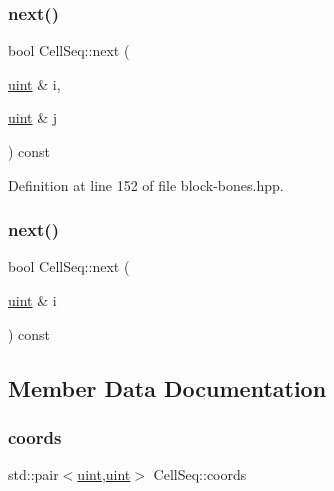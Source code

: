 \subsubsection{\texorpdfstring{next()}{next()}\hspace{0.1cm}{\footnotesize\ttfamily [1/2]}}
{\footnotesize\ttfamily bool Cell\+Seq\+::next (\begin{DoxyParamCaption}\item[{\hyperlink{typedefs_8hpp_a91ad9478d81a7aaf2593e8d9c3d06a14}{uint} \&}]{i,  }\item[{\hyperlink{typedefs_8hpp_a91ad9478d81a7aaf2593e8d9c3d06a14}{uint} \&}]{j }\end{DoxyParamCaption}) const\hspace{0.3cm}{\ttfamily [inline]}}



Definition at line 152 of file block-\/bones.\+hpp.

\mbox{\label{class_cell_seq_a799a65f5ea44cc1c752d39d6e7613364}} 
\subsubsection{\texorpdfstring{next()}{next()}\hspace{0.1cm}{\footnotesize\ttfamily [2/2]}}
{\footnotesize\ttfamily bool Cell\+Seq\+::next (\begin{DoxyParamCaption}\item[{\hyperlink{typedefs_8hpp_a91ad9478d81a7aaf2593e8d9c3d06a14}{uint} \&}]{i }\end{DoxyParamCaption}) const}



\subsection{Member Data Documentation}
\mbox{\label{class_cell_seq_af68709ebb782d4ffc243788c3dd256f4}} 
\subsubsection{\texorpdfstring{coords}{coords}}
{\footnotesize\ttfamily std\+::pair$<$\hyperlink{typedefs_8hpp_a91ad9478d81a7aaf2593e8d9c3d06a14}{uint},\hyperlink{typedefs_8hpp_a91ad9478d81a7aaf2593e8d9c3d06a14}{uint}$>$ Cell\+Seq\+::coords\hspace{0.3cm}{\ttfamily [protected]}}



